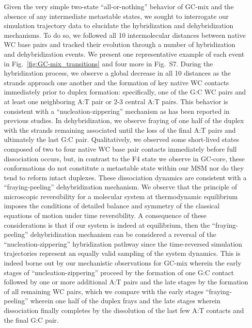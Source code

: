 \documentclass[journal=jpcbfk,manuscript=article]{achemso}
\newcommand*{\rood}[1]{{#1}}
\newcommand*{\blauw}[1]{{#1}}
\begin{document}
Given the very simple two-state ``all-or-nothing'' behavior of GC-mix and the absence of any intermediate metastable states, we sought to interrogate our simulation trajectory data to elucidate the hybridization and dehybridization mechanisms. To do so, we followed all 10 intermolecular distances between native WC base pairs and tracked their evolution through a number of hybridization and dehybridization events. We present one representative example of each event in Fig.~\ref{fig:GC-mix_transitions} and four more in \blauw{Fig.~S7}. During the hybridization process, we observe a global decrease in all 10 distances as the strands approach one another and the formation of key native WC contacts immediately prior to duplex formation: specifically, one of the G:C WC pairs and at least one neighboring A:T pair or 2-3 central A:T pairs. This behavior is consistent with a ``nucleation-zippering'' mechanism as has been reported in previous studies.\citep{Wetmur1968KineticsDNA, Porschke1971CooperativeTransition, Sambriski2009SequencePathways,  Yin2011KineticsHybridization} In dehybridization, we observe fraying \rood{of one half of the duplex with the strands remaining associated until the loss of the final A:T pairs and ultimately the last G:C pair}. Qualitatively, we observed some short-lived states composed of two to four native WC base pair contacts immediately before full dissociation occurs, but, in contrast to the F4 state we observe in GC-core, these conformations do not constitute a metastable state within our MSM nor do they tend to reform intact duplexes. These dissociation dynamics are consistent with a ``fraying-peeling'' dehybridization mechanism.\citep{Wong2008TheSimulations, Perez2010Real-timeUnfolding, Zgarbova2014BaseRNA} \rood{We observe that the principle of microscopic reversibility for a molecular system at thermodynamic equilibrium imposes the conditions of detailed balance and symmetry of the classical equations of motion under time reversibility. \cite{McCully2008MicroscopicHomeodomain} A consequence of these considerations is that if our system is indeed at equilibrium, then the ``fraying-peeling'' dehybridization mechanism can be considered a reversal of the ``nucleation-zippering'' hybridization pathway since the time-reversed simulation trajectories represent an equally valid sampling of the system dynamics. This is indeed borne out by our mechanistic observations for GC-mix wherein the early stages of ``nucleation-zippering'' proceed by the formation of one G:C contact followed by one or more additional A:T pairs and the late stages by the formation of all remaining WC pairs, which we compare with the early stages ``fraying-peeling'' wherein one half of the duplex frays and the late stages wherein dissociation finally completes by the dissolution of the last few A:T contacts and the final G:C pair.}
\end{document}
